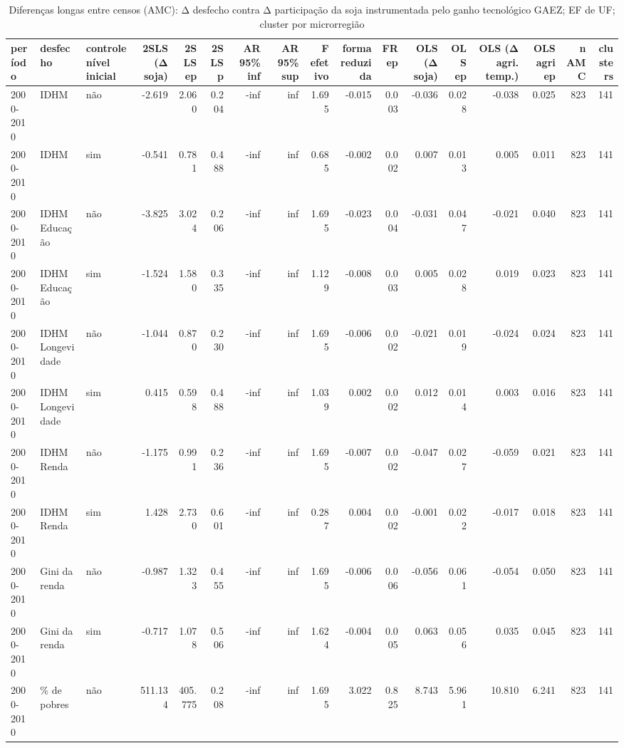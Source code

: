 \begin{table}
\caption{Diferenças longas entre censos (AMC): Δ desfecho contra Δ participação da soja instrumentada pelo ganho tecnológico GAEZ; EF de UF; cluster por microrregião}
\label{tab:s08_censos_dif_longas}
\begin{tabular}{lllrrrrrrrrrrrrrr}
\toprule
período & desfecho & controle nível inicial & 2SLS (Δ soja) & 2SLS ep & 2SLS p & AR 95\% inf & AR 95\% sup & F efetivo & forma reduzida & FR ep & OLS (Δ soja) & OLS ep & OLS (Δ agri. temp.) & OLS agri ep & n AMC & clusters \\
\midrule
2000-2010 & IDHM & não & -2.619 & 2.060 & 0.204 & -inf & inf & 1.695 & -0.015 & 0.003 & -0.036 & 0.028 & -0.038 & 0.025 & 823 & 141 \\
2000-2010 & IDHM & sim & -0.541 & 0.781 & 0.488 & -inf & inf & 0.685 & -0.002 & 0.002 & 0.007 & 0.013 & 0.005 & 0.011 & 823 & 141 \\
2000-2010 & IDHM Educação & não & -3.825 & 3.024 & 0.206 & -inf & inf & 1.695 & -0.023 & 0.004 & -0.031 & 0.047 & -0.021 & 0.040 & 823 & 141 \\
2000-2010 & IDHM Educação & sim & -1.524 & 1.580 & 0.335 & -inf & inf & 1.129 & -0.008 & 0.003 & 0.005 & 0.028 & 0.019 & 0.023 & 823 & 141 \\
2000-2010 & IDHM Longevidade & não & -1.044 & 0.870 & 0.230 & -inf & inf & 1.695 & -0.006 & 0.002 & -0.021 & 0.019 & -0.024 & 0.024 & 823 & 141 \\
2000-2010 & IDHM Longevidade & sim & 0.415 & 0.598 & 0.488 & -inf & inf & 1.039 & 0.002 & 0.002 & 0.012 & 0.014 & 0.003 & 0.016 & 823 & 141 \\
2000-2010 & IDHM Renda & não & -1.175 & 0.991 & 0.236 & -inf & inf & 1.695 & -0.007 & 0.002 & -0.047 & 0.027 & -0.059 & 0.021 & 823 & 141 \\
2000-2010 & IDHM Renda & sim & 1.428 & 2.730 & 0.601 & -inf & inf & 0.287 & 0.004 & 0.002 & -0.001 & 0.022 & -0.017 & 0.018 & 823 & 141 \\
2000-2010 & Gini da renda & não & -0.987 & 1.323 & 0.455 & -inf & inf & 1.695 & -0.006 & 0.006 & -0.056 & 0.061 & -0.054 & 0.050 & 823 & 141 \\
2000-2010 & Gini da renda & sim & -0.717 & 1.078 & 0.506 & -inf & inf & 1.624 & -0.004 & 0.005 & 0.063 & 0.056 & 0.035 & 0.045 & 823 & 141 \\
2000-2010 & \% de pobres & não & 511.134 & 405.775 & 0.208 & -inf & inf & 1.695 & 3.022 & 0.825 & 8.743 & 5.961 & 10.810 & 6.241 & 823 & 141 \\

\end{tabular}
\end{table}
